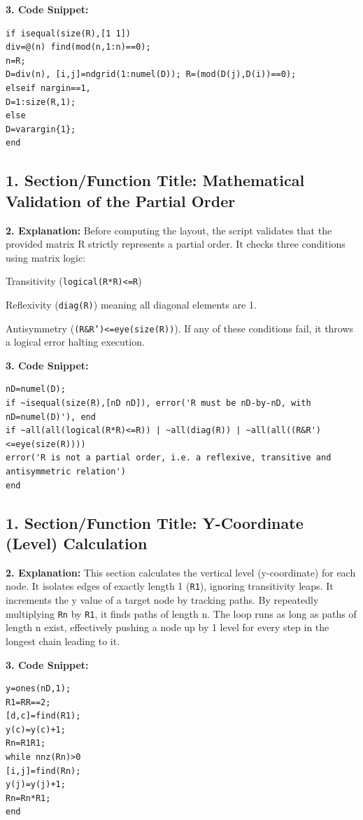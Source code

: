 \textbf{3. Code Snippet:}
\begin{lstlisting}
if isequal(size(R),[1 1])
div=@(n) find(mod(n,1:n)==0);
n=R;
D=div(n), [i,j]=ndgrid(1:numel(D)); R=(mod(D(j),D(i))==0);
elseif nargin==1,
D=1:size(R,1);
else
D=varargin{1};
end
\end{lstlisting}

\vspace{0.5cm}

\subsection*{1. Section/Function Title: Mathematical Validation of the Partial Order}
\textbf{2. Explanation:} Before computing the layout, the script validates that the provided matrix R strictly represents a partial order. It checks three conditions using matrix logic:

Transitivity (\texttt{logical(R*R)<=R})

Reflexivity (\texttt{diag(R)}) meaning all diagonal elements are 1.

Antisymmetry (\texttt{(R\&R')<=eye(size(R))}).
If any of these conditions fail, it throws a logical error halting execution.

\textbf{3. Code Snippet:}
\begin{lstlisting}
nD=numel(D);
if ~isequal(size(R),[nD nD]), error('R must be nD-by-nD, with nD=numel(D)'), end
if ~all(all(logical(R*R)<=R)) | ~all(diag(R)) | ~all(all((R&R')<=eye(size(R))))
error('R is not a partial order, i.e. a reflexive, transitive and antisymmetric relation')
end
\end{lstlisting}

\vspace{0.5cm}

\subsection*{1. Section/Function Title: Y-Coordinate (Level) Calculation}
\textbf{2. Explanation:} This section calculates the vertical level (y-coordinate) for each node. It isolates edges of exactly length 1 (\texttt{R1}), ignoring transitivity leaps. It increments the y value of a target node by tracking paths. By repeatedly multiplying \texttt{Rn} by \texttt{R1}, it finds paths of length n. The loop runs as long as paths of length n exist, effectively pushing a node up by 1 level for every step in the longest chain leading to it.

\textbf{3. Code Snippet:}
\begin{lstlisting}
y=ones(nD,1);
R1=RR==2;
[d,c]=find(R1);
y(c)=y(c)+1;
Rn=R1R1;
while nnz(Rn)>0
[i,j]=find(Rn);
y(j)=y(j)+1;
Rn=Rn*R1;
end
\end{lstlisting}

